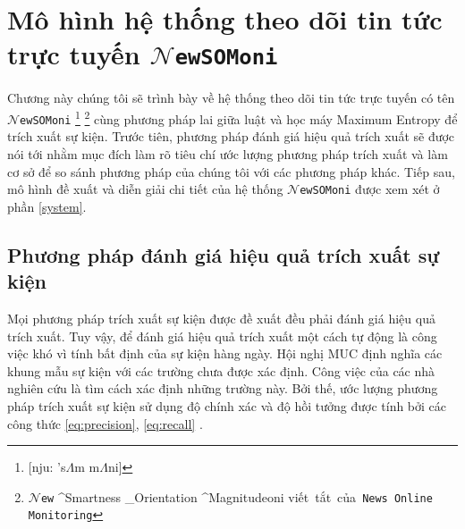 
\chapter{Mô hình hệ thống theo dõi tin tức trực tuyến $\mathcal{N}$\texttt{ewSOMoni}} %



\ifpdf
    \graphicspath{{3/figures/PNG/}{3/figures/PDF/}{3/figures/}}
\else
    \graphicspath{{3/figures/EPS/}{3/figures/}}
\fi



\noindent Chương này chúng tôi sẽ trình bày về hệ thống theo dõi tin tức trực tuyến có tên $\mathcal{N}$\texttt{ewSOMoni}
\footnote{[nju: 's$\Lambda$m m$\Lambda$ni]} \footnote{$\mathcal{N}$\texttt{ew} ^{\mbox{Smartness}} _{\mbox{Orientation}} ^{\mbox{Magnitude}}oni \hspace{0.2in}   \mbox{viết tắt của \texttt{News Online Monitoring}}} cùng  phương pháp lai giữa luật và học máy Maximum Entropy để  trích xuất sự kiện.
Trước tiên, phương pháp  đánh giá hiệu quả trích xuất sẽ được nói tới nhằm mục đích làm rõ tiêu chí ước lượng phương pháp trích xuất và làm cơ sở để so sánh phương pháp của chúng tôi với các  phương pháp khác. Tiếp sau, mô hình đề xuất và diễn giải chi tiết của hệ thống $\mathcal{N}$\texttt{ewSOMoni} được xem xét ở phần \ref{system}.


\section{Phương pháp đánh giá hiệu quả trích xuất sự kiện}
\noindent Mọi phương pháp trích xuất sự kiện được đề xuất đều phải đánh giá hiệu quả trích xuất. Tuy vậy, để đánh giá hiệu quả trích xuất một cách tự động là công việc khó vì tính bất định của sự kiện hàng ngày.
Hội nghị MUC định nghĩa các khung mẫu sự kiện với các trường chưa được xác định. Công việc của các nhà nghiên cứu là tìm cách xác định những trường này. Bởi thế, ước lượng phương pháp trích xuất sự kiện sử dụng độ chính xác và độ hồi tưởng được tính bởi các công thức \ref{eq:precision}, \ref{eq:recall} \cite{RB96}.

